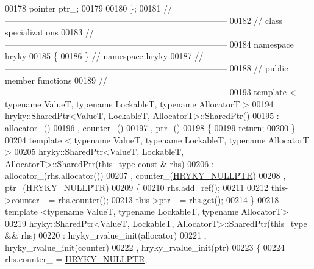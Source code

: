 \begin{DoxyCode}
00178     pointer         ptr\_;
00179 
00180 \};
00181 \textcolor{comment}{//
      ------------------------------------------------------------------------------}
00182 \textcolor{comment}{// class specializations}
00183 \textcolor{comment}{//
      ------------------------------------------------------------------------------}
00184 \textcolor{keyword}{namespace }hryky
00185 \{
00186 \} \textcolor{comment}{// namespace hryky}
00187 \textcolor{comment}{//
      ------------------------------------------------------------------------------}
00188 \textcolor{comment}{// public member functions}
00189 \textcolor{comment}{//
      ------------------------------------------------------------------------------}
00193 \textcolor{comment}{}\textcolor{keyword}{template} < \textcolor{keyword}{typename} ValueT, \textcolor{keyword}{typename} LockableT, \textcolor{keyword}{typename} AllocatorT >
00194 \hyperlink{classhryky_1_1_shared_ptr_ae0b292aca6b803da2a8333be15775852}{hryky::SharedPtr<ValueT, LockableT, AllocatorT>::SharedPtr}()
00195     : allocator\_()
00196       , counter\_()
00197       , ptr\_()
00198 \{
00199     \textcolor{keywordflow}{return};
00200 \}
00204 \textcolor{keyword}{template} < \textcolor{keyword}{typename} ValueT, \textcolor{keyword}{typename} LockableT, \textcolor{keyword}{typename} AllocatorT >
\hypertarget{shared__ptr_8h_source_l00205}{}\hyperlink{classhryky_1_1_shared_ptr_aeb55aedc7398bb3989a9b7293688721e}{00205} \hyperlink{classhryky_1_1_shared_ptr}{hryky::SharedPtr<ValueT, LockableT, AllocatorT>::SharedPtr}(\hyperlink{classhryky_1_1_shared_ptr}{this_type} \textcolor{keyword}{const} & 
      rhs)
00206     : allocator\_(rhs.allocator())
00207       , counter\_(\hyperlink{common_8h_a4cd4ac09cfcdbd6b30ee69afc156e210}{HRYKY_NULLPTR})
00208       , ptr\_(\hyperlink{common_8h_a4cd4ac09cfcdbd6b30ee69afc156e210}{HRYKY_NULLPTR})
00209 \{
00210     rhs.add\_ref();
00211 
00212     this->counter\_ = rhs.counter();
00213     this->ptr\_ = rhs.get();
00214 \}
00218 \textcolor{keyword}{template} <\textcolor{keyword}{typename} ValueT, \textcolor{keyword}{typename} LockableT, \textcolor{keyword}{typename} AllocatorT>
\hypertarget{shared__ptr_8h_source_l00219}{}\hyperlink{classhryky_1_1_shared_ptr_a3e14d3aa2f8ff15fa3e7d6ef58339dd4}{00219} \hyperlink{classhryky_1_1_shared_ptr}{hryky::SharedPtr<ValueT, LockableT, AllocatorT>::SharedPtr}(\hyperlink{classhryky_1_1_shared_ptr}{this_type} && rhs)
00220     : hryky\_rvalue\_init(allocator)
00221       , hryky\_rvalue\_init(counter)
00222       , hryky\_rvalue\_init(ptr)
00223 \{
00224     rhs.counter\_ = \hyperlink{common_8h_a4cd4ac09cfcdbd6b30ee69afc156e210}{HRYKY_NULLPTR};

\end{DoxyCode}
